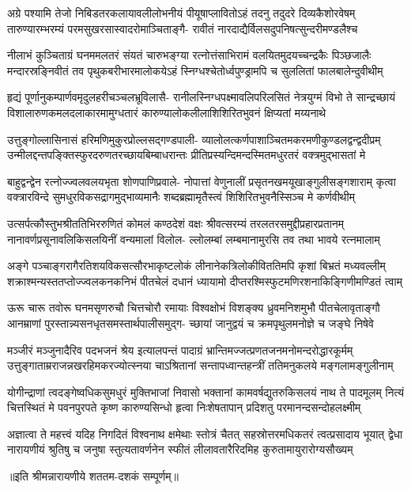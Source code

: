 

\fourlineindentedshloka
{अग्रे पश्यामि तेजो निबिडतरकलायावलीलोभनीयं}
{पीयूषाप्लावितोऽहं तदनु तदुदरे दिव्यकैशोरवेषम्}
{तारुण्यारम्भरम्यं परमसुखरसास्वादरोमाञ्चिताङ्गै-}
{रावीतं नारदाद्यैर्विलसदुपनिषत्सुन्दरीमण्डलैश्च}

\fourlineindentedshloka
{नीलाभं कुञ्चिताग्रं घनममलतरं संयतं चारुभङ्ग्या}
{रत्नोत्तंसाभिरामं वलयितमुदयच्चन्द्रकैः पिञ्छजालैः}
{मन्दारस्रङ्निवीतं तव पृथुकबरीभारमालोकयेऽहं}
{स्निग्धश्चेतोर्ध्वपुण्ड्रामपि च सुललितां फालबालेन्दुवीथीम्}

\fourlineindentedshloka
{हृद्यं पूर्णानुकम्पार्णवमृदुलहरीचञ्चलभ्रूविलासै-}
{रानीलस्निग्धपक्ष्मावलिपरिलसितं नेत्रयुग्मं विभो ते}
{सान्द्रच्छायं विशालारुणकमलदलाकारमामुग्धतारं}
{कारुण्यालोकलीलाशिशिरितभुवनं क्षिप्यतां मय्यनाथे}

\fourlineindentedshloka
{उत्तुङ्गोल्लासिनासं हरिमणिमुकुरप्रोल्लसद्गण्डपाली-}
{व्यालोलत्कर्णपाशाञ्चितमकरमणीकुण्डलद्वन्द्वदीप्रम्}
{उन्मीलद्दन्तपङ्क्तिस्फुरदरुणतरच्छायबिम्बाधरान्तः}
{प्रीतिप्रस्यन्दिमन्दस्मितमधुरतरं वक्त्रमुद्भासतां मे}

\fourlineindentedshloka
{बाहुद्वन्द्वेन रत्नोज्ज्वलवलयभृता शोणपाणिप्रवाले-}
{नोपात्तां वेणुनालीं प्रसृतनखमयूखाङ्गुलीसङ्गशाराम्}
{कृत्वा वक्त्रारविन्दे सुमधुरविकसद्रागमुद्भाव्यमानैः}
{शब्दब्रह्मामृतैस्त्वं शिशिरितभुवनैस्सिञ्च मे कर्णवीथीम्}

\fourlineindentedshloka
{उत्सर्पत्कौस्तुभश्रीततिभिररुणितं कोमलं कण्ठदेशं}
{वक्षः श्रीवत्सरम्यं तरलतरसमुद्दीप्रहारप्रतानम्}
{नानावर्णप्रसूनावलिकिसलयिनीं वन्यमालां विलोल-}
{ल्लोलम्बां लम्बमानामुरसि तव तथा भावये रत्नमालाम्}

\fourlineindentedshloka
{अङ्गे पञ्चाङ्गरागैरतिशयविकसत्सौरभाकृष्टलोकं}
{लीनानेकत्रिलोकीविततिमपि कृशां बिभ्रतं मध्यवल्लीम्}
{शक्राश्मन्यस्ततप्तोज्ज्वलकनकनिभं पीतचेलं दधानं}
{ध्यायामो दीप्तरश्मिस्फुटमणिरशनाकिङ्गिणीमण्डितं त्वाम्}

\fourlineindentedshloka
{ऊरू चारू तवोरू घनमसृणरुचौ चित्तचोरौ रमायाः}
{विश्वक्षोभं विशङ्क्य ध्रुवमनिशमुभौ पीतचेलावृताङ्गौ}
{आनम्राणां पुरस्तान्न्यसनधृतसमस्तार्थपालीसमुद्ग-}
{च्छायां जानुद्वयं च क्रमपृथुलमनोज्ञे च जङ्घे निषेवे}

\fourlineindentedshloka
{मञ्जीरं मञ्जुनादैरिव पदभजनं श्रेय इत्यालपन्तं}
{पादाग्रं भ्रान्तिमज्जत्प्रणतजनमनोमन्दरोद्धारकूर्मम्}
{उत्तुङ्गाताम्रराजन्नखरहिमकरज्योत्स्नया चाऽश्रितानां}
{सन्तापध्वान्तहन्त्रीं ततिमनुकलये मङ्गलामङ्गुलीनाम्}

\fourlineindentedshloka
{योगीन्द्राणां त्वदङ्गेष्वधिकसुमधुरं मुक्तिभाजां निवासो}
{भक्तानां कामवर्षद्युतरुकिसलयं नाथ ते पादमूलम्}
{नित्यं चित्तस्थितं मे पवनपुरपते कृष्ण कारुण्यसिन्धो}
{हृत्वा निःशेषतापान् प्रदिशतु परमानन्दसन्दोहलक्ष्मीम्}

\fourlineindentedshloka
{अज्ञात्वा ते महत्त्वं यदिह निगदितं विश्वनाथ क्षमेथाः}
{स्तोत्रं चैतत् सहस्रोत्तरमधिकतरं त्वत्प्रसादाय भूयात्}
{द्वेधा नारायणीयं श्रुतिषु च जनुषा स्तुत्यतावर्णनेन}
{स्फीतं लीलावतारैरिदमिह कुरुतामायुरारोग्यसौख्यम्}

{॥इति श्रीमन्नारायणीये शततम-दशकं सम्पूर्णम्॥}
